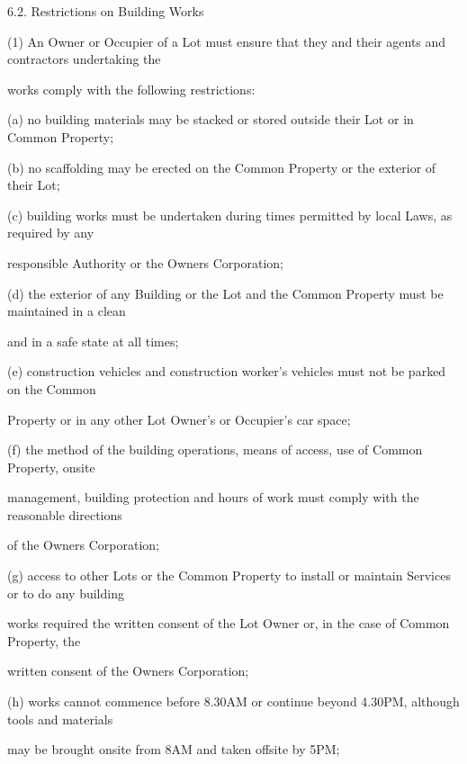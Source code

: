 \documentclass{article}
\begin{document}
{\fontsize{9.99}{1}6.2. Restrictions on Building Works }

{\fontsize{9.962}{1}(1) An Owner or Occupier of a Lot must ensure that they and their agents and contractors undertaking the }

{\fontsize{10.02}{1}works comply with the following restrictions: }

{\fontsize{9.962}{1}(a) no building materials may be stacked or stored outside their Lot or in Common Property; }

{\fontsize{9.962}{1}(b) no scaffolding may be erected on the Common Property or the exterior of their Lot; }

{\fontsize{9.962}{1}(c) building works must be undertaken during times permitted by local Laws, as required by any }

{\fontsize{10.02}{1}responsible Authority or the Owners Corporation; }

{\fontsize{9.962}{1}(d) the exterior of any Building or the Lot and the Common Property must be maintained in a clean }

{\fontsize{10.02}{1}and in a safe state at all times; }

{\fontsize{9.962}{1}(e) construction vehicles and construction worker’s vehicles must not be parked on the Common }

{\fontsize{10.02}{1}Property or in any other Lot Owner’s or Occupier’s car space; }

{\fontsize{9.962}{1}(f) the method of the building operations, means of access, use of Common Property, onsite }

{\fontsize{10.02}{1}management, building protection and hours of work must comply with the reasonable directions }

{\fontsize{10.02}{1}of the Owners Corporation; }

{\fontsize{9.962}{1}(g) access to other Lots or the Common Property to install or maintain Services or to do any building }

{\fontsize{10.02}{1}works required the written consent of the Lot Owner or, in the case of Common Property, the }

{\fontsize{10.02}{1}written consent of the Owners Corporation; }

{\fontsize{9.962}{1}(h) works cannot commence before 8.30AM or continue beyond 4.30PM, although tools and materials }

{\fontsize{10.02}{1}may be brought onsite from 8AM and taken offsite by 5PM; }

\newpage
\end{document}
